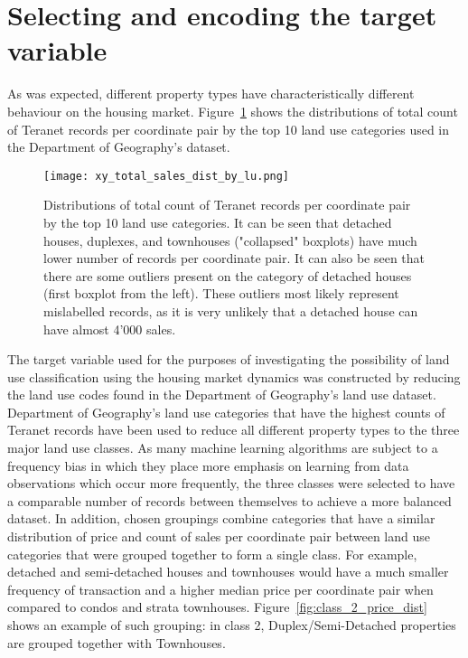 \section{Selecting and encoding the target variable} \label{sec:select_encode_target}

As was expected, different property types have characteristically different behaviour on the housing market.
Figure~\ref{fig:xy_total_sales_dist_by_lu} shows the distributions of total count of Teranet records per coordinate pair by the top 10 land use categories used in the Department of Geography's dataset.

\begin{figure}[hbt!]
    \centering
    \texttt{[image: xy\_total\_sales\_dist\_by\_lu.png]}
    \caption{Distributions of total count of Teranet records per coordinate pair by the top 10 land use categories.
    It can be seen that detached houses, duplexes, and townhouses ("collapsed" boxplots) have much lower number of records per coordinate pair.
    It can also be seen that there are some outliers present on the category of detached houses (first boxplot from the left).
    These outliers most likely represent mislabelled records, as it is very unlikely that a detached house can have almost 4'000 sales.}
    \label{fig:xy_total_sales_dist_by_lu}
\end{figure}

The target variable used for the purposes of investigating the possibility of land use classification using the housing market dynamics was constructed by reducing the land use codes found in the Department of Geography's land use dataset.
Department of Geography's land use categories that have the highest counts of Teranet records have been used to reduce all different property types to the three major land use classes.
As many machine learning algorithms are subject to a frequency bias in which they place more emphasis on learning from data observations which occur more frequently, the three classes were selected to have a comparable number of records between themselves to achieve a more balanced dataset.
In addition, chosen groupings combine categories that have a similar distribution of price and count of sales per coordinate pair between land use categories that were grouped together to form a single class.
For example, detached and semi-detached houses and townhouses would have a much smaller frequency of transaction and a higher median price per coordinate pair when compared to condos and strata townhouses.
Figure~\ref{fig:class_2_price_dist} shows an example of such grouping: in class 2, Duplex/Semi-Detached properties are grouped together with Townhouses.

